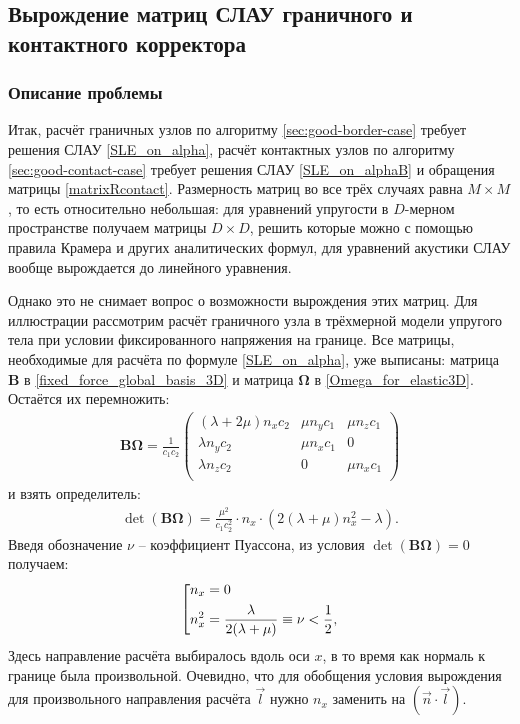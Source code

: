 \subsection{Вырождение матриц СЛАУ граничного и контактного корректора}
\subsubsection{Описание проблемы}
\label{degeneration_problem}
Итак, расчёт граничных узлов по алгоритму \ref{sec:good-border-case} 
требует решения СЛАУ \ref{SLE_on_alpha}, 
расчёт контактных узлов по алгоритму \ref{sec:good-contact-case} требует 
решения СЛАУ \ref{SLE_on_alphaB} и обращения матрицы \ref{matrixRcontact}.
Размерность матриц во все трёх случаях равна $M \times M$, 
то есть относительно небольшая: для уравнений упругости в $D$-мерном 
пространстве получаем матрицы $D \times D$, решить которые можно 
с помощью правила Крамера и других аналитических формул, 
для уравнений акустики СЛАУ вообще вырождается до линейного уравнения.

Однако это не снимает вопрос о возможности вырождения этих матриц. 
Для иллюстрации рассмотрим расчёт граничного узла в трёхмерной 
модели упругого тела при условии фиксированного напряжения на границе. 
Все матрицы, необходимые для расчёта по формуле \ref{SLE_on_alpha}, уже выписаны: 
матрица $\mathbf{B}$ в \ref{fixed_force_global_basis_3D} и 
матрица $\mathbf{\Omega}$ в \ref{Omega_for_elastic3D}. 
Остаётся их перемножить:
\begin{align}
	\mathbf{B} \mathbf{\Omega} = \frac{1}{c_1 c_2}
	\left( \begin{array}{cccccccccccc}
	 (\lambda + 2\mu) n_x c_2 & \mu n_y c_1 & \mu n_z c_1   \\
	 \lambda n_y c_2          & \mu n_x c_1 & 0             \\
	 \lambda n_z c_2          & 0 & \mu n_x c_1             \\
	\end{array} \right)
\end{align}
и взять определитель:
\begin{eqnarray}
	\det (\mathbf{B} \mathbf{\Omega}) = \frac{\mu^{2}}{c_1 c^2_2} \cdot n_x \cdot (2 (\lambda + \mu) n^2_x - \lambda).
\end{eqnarray}
Введя обозначение $\nu$ -- коэффициент Пуассона, из условия 
$\det (\mathbf{B} \mathbf{\Omega}) = 0$ получаем:
\begin{eqnarray}
\left[
\begin{gathered} 
	 n_x = 0  \hfill  \\
	 n^2_x = \frac{\lambda}{2(\lambda + \mu)} \equiv \nu < \frac{1}{2}, \hfill  \\
\end{gathered} 
\right.
\end{eqnarray}
Здесь направление расчёта выбиралось вдоль оси $x$, в то время как нормаль 
к границе была произвольной. Очевидно, что для обобщения условия 
вырождения для произвольного направления расчёта $\vec{l}$ нужно $n_x$ заменить на 
$(\vec{n} \cdot \vec{l})$.

